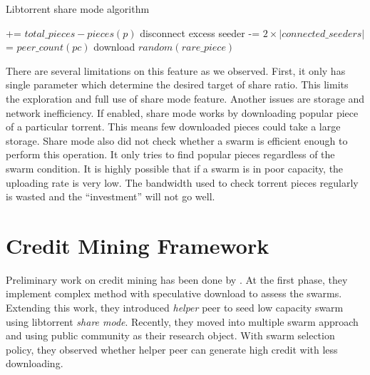 \begin{algorithm}[]
	\caption{Libtorrent share mode algorithm}
	\label{alg:ltsharemode}
	\begin{algorithmic}[1]
		\Statex
		 += {$total\_pieces - pieces(p)$} \label{alg:l_lts:missingp}
		\EndIf	
		\EndFor
		\State disconnect excess seeder \label{alg:l_lts:disconnectpeers}
		\EndIf
		 -= {$2 \times |connected\_seeders|$}	\label{alg:l_lts:reducemissing}	
		\State \Return
		\EndIf
		 \label{alg:l_lts:retdlenough}
		\State \Return
		\EndIf
		 \label{alg:l_lts:retdling}
		\State \Return
		\EndIf
			\label{alg:l_lts:rarepc}
				 = {$peer\_count(pc)$} 
		\EndIf	
		\EndFor
		 \label{alg:l_lts:rareunable}
		\State \Return
		\EndIf
		\State download {$random(rare\_piece)$} \label{alg:l_lts:dlrare}
	\end{algorithmic}
\end{algorithm}

There are several limitations on this feature as we observed. First, it only has single parameter which determine the desired target of share ratio. This limits the exploration and full use of share mode feature. Another issues are storage and network inefficiency. If enabled, share mode works by downloading popular piece of a particular torrent. This means few downloaded pieces could take a large storage. Share mode also did not check whether a swarm is efficient enough to perform this operation. It only tries to find popular pieces regardless of the swarm condition. It is highly possible that if a swarm is in poor capacity, the uploading rate is very low. The bandwidth used to check torrent pieces regularly is wasted and the ``investment'' will not go well.

\section{Credit Mining Framework}
\label{section:cmprior}
Preliminary work on credit mining has been done by \citeauthor{2015:creditmining:capota} \cite{2015:creditmining:capota, 2013:investmentcm:capota, 2014:bwmarket:capota}. At the first phase, they implement complex method with speculative download to assess the swarms\cite{2013:investmentcm:capota}. Extending this work, they introduced \textit{helper} peer to seed low capacity swarm using libtorrent \textit{share mode}\cite{2014:bwmarket:capota}. Recently, they moved into multiple swarm approach and using public community as their research object. With swarm selection policy, they observed whether helper peer can generate high credit with less downloading\cite{2015:creditmining:capota}.

